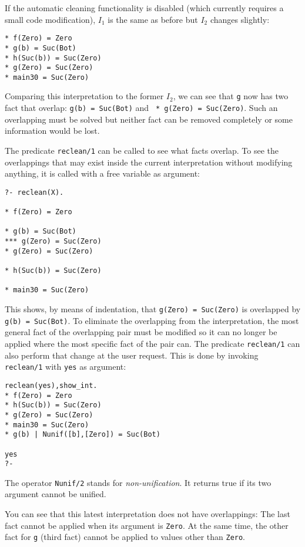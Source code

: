 \documentclass[11pt,a4paper,twoside,openright]{book}
\begin{document}
If the automatic cleaning functionality is disabled (which currently
requires a small code modification), $I_1$ is the same as before but
$I_2$ changes slightly:

\begin{verbatim}
* f(Zero) = Zero
* g(b) = Suc(Bot)
* h(Suc(b)) = Suc(Zero)
* g(Zero) = Suc(Zero)
* main30 = Suc(Zero)
\end{verbatim}

\noindent
Comparing this interpretation to the former $I_2$, we can see that
{\tt g} now has two fact that overlap: {\tt * g(b) = Suc(Bot)} and {\tt
  * g(Zero) = Suc(Zero)}. Such an overlapping must be solved but
neither fact can be removed completely or some information would be
lost.

The predicate {\tt reclean/1} can be called to see what facts
overlap. To see the overlappings that may exist inside the current
interpretation without modifying anything, it is called with a free
variable as argument:

\begin{verbatim}
?- reclean(X).

* f(Zero) = Zero

* g(b) = Suc(Bot)
*** g(Zero) = Suc(Zero)
* g(Zero) = Suc(Zero)

* h(Suc(b)) = Suc(Zero)

* main30 = Suc(Zero)
\end{verbatim}

\noindent
This shows, by means of indentation, that {\tt g(Zero) = Suc(Zero)} is
overlapped by {\tt * g(b) = Suc(Bot)}. To eliminate the overlapping
from the interpretation, the most general fact of the overlapping pair
must be modified so it can no longer be applied where the most
specific fact of the pair can. The predicate {\tt reclean/1} can also
perform that change at the user request. This is done by invoking {\tt
  reclean/1} with {\tt yes} as argument:

\begin{verbatim}
reclean(yes),show_int.
* f(Zero) = Zero
* h(Suc(b)) = Suc(Zero)
* g(Zero) = Suc(Zero)
* main30 = Suc(Zero)
* g(b) | Nunif([b],[Zero]) = Suc(Bot)

yes
?- 
\end{verbatim}   

\noindent
The operator {\tt Nunif/2} stands for {\em non-unification}. It
returns true if its two argument cannot be unified.

You can see that this latest interpretation does not have
overlappings: The last fact cannot be applied when its argument is
{\tt Zero}. At the same time, the other fact for {\tt g} (third fact)
cannot be applied to values other than {\tt Zero}. 
\end{document}

